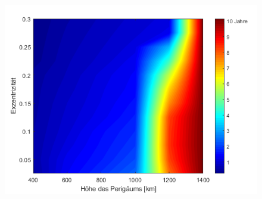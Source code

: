 \begin{figure}[h]
	\centering
		\includegraphics[width=1.00\textwidth]{./graphics/GMAT/ecc_perigee_550kg.png}
	\label{fig:GMAT_ecc_550}
\end{figure}




